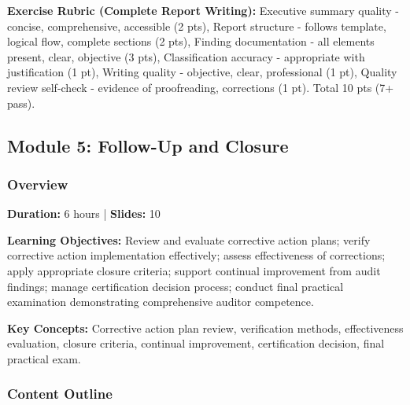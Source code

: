 \documentclass[11pt,a4paper]{article}
\begin{document}
\textbf{Exercise Rubric (Complete Report Writing):} Executive summary quality - concise, comprehensive, accessible (2 pts), Report structure - follows template, logical flow, complete sections (2 pts), Finding documentation - all elements present, clear, objective (3 pts), Classification accuracy - appropriate with justification (1 pt), Writing quality - objective, clear, professional (1 pt), Quality review self-check - evidence of proofreading, corrections (1 pt). Total 10 pts (7+ pass).

\subsection{Module 5: Follow-Up and Closure}

\subsubsection{Overview}
\textbf{Duration:} 6 hours | \textbf{Slides:} 10

\textbf{Learning Objectives:} Review and evaluate corrective action plans; verify corrective action implementation effectively; assess effectiveness of corrections; apply appropriate closure criteria; support continual improvement from audit findings; manage certification decision process; conduct final practical examination demonstrating comprehensive auditor competence.

\textbf{Key Concepts:} Corrective action plan review, verification methods, effectiveness evaluation, closure criteria, continual improvement, certification decision, final practical exam.

\subsubsection{Content Outline}
\end{document}
